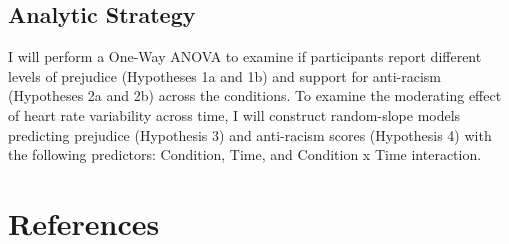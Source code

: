 \documentclass[
  english,
  man, noextraspace,floatsintext]{apa6}
\begin{document}
\hypertarget{analytic-strategy}{%
\subsection{Analytic Strategy}\label{analytic-strategy}}

I will perform a One-Way ANOVA to examine if participants report different levels of prejudice (Hypotheses 1a and 1b) and support for anti-racism (Hypotheses 2a and 2b) across the conditions. To examine the moderating effect of heart rate variability across time, I will construct random-slope models predicting prejudice (Hypothesis 3) and anti-racism scores (Hypothesis 4) with the following predictors: Condition, Time, and Condition x Time interaction.

\newpage

\hypertarget{references}{%
\section{References}\label{references}}

\setlength{\parindent}{-0.5in}
\setlength{\leftskip}{0.5in}
\end{document}
